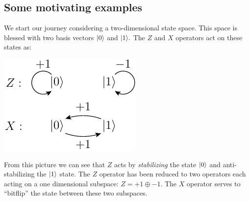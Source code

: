 
\subsection{Some motivating examples}

We start our journey considering a two-dimensional state space.
This space is blessed with two basis vectors $|{0}\rangle$ and $|{1}\rangle.$
The $Z$ and $X$ operators act on these states as:
\begin{center}
\includegraphics[]{pic-zx.pdf}
\end{center}
From this picture we can see that $Z$ acts by \emph{stabilizing} the
state $|{0}\rangle$ and anti-stabilizing the $|{1}\rangle$ state.
The $Z$ operator has been reduced 
to two operators each acting on a one dimensional subspace:
$Z = +1 \oplus -1.$
The $X$ operator serves to ``bitflip'' the state between
these two subspaces.

